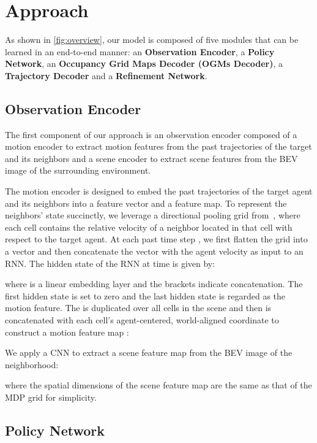 \documentclass[10pt,twocolumn,letterpaper]{article}
\begin{document}
\section{Approach}
\label{sec:approach}
As shown in \cref{fig:overview}, our model is composed of five modules that can be learned in an end-to-end manner: an \textbf{Observation Encoder}, a \textbf{Policy Network}, an \textbf{Occupancy Grid Maps Decoder (OGMs Decoder)}, a \textbf{Trajectory Decoder} and a \textbf{Refinement Network}.



\subsection{Observation Encoder}

The first component of our approach is an observation encoder composed of a motion encoder to extract motion features from the past trajectories of the target and its neighbors and a scene encoder to extract scene features from the BEV image of the surrounding environment. 

 The motion encoder is designed to embed the past trajectories of the target agent and its neighbors into a feature vector and a feature map. To represent the neighbors' state succinctly, we leverage a directional pooling grid from~\cite{kothari2021human}, where each cell contains the relative velocity of a neighbor located in that cell with respect to the target agent. At each past time step , we first flatten the grid into a vector  and then concatenate the vector with the agent velocity  as input to an RNN. The hidden state of the RNN at time  is given by:

where  is a linear embedding layer and the brackets indicate concatenation. The first hidden state  is set to zero and the last hidden state  is regarded as the motion feature. The  is duplicated over all cells in the scene and then is concatenated with each cell's agent-centered, world-aligned coordinate to construct a motion feature map  :


 We apply a CNN to extract a scene feature map from the BEV image  of the neighborhood:

where the spatial dimensions of the scene feature map  are the same as that of the MDP grid for simplicity. 

\subsection{Policy Network}
\end{document}

